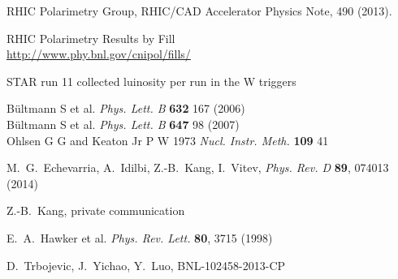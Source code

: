 \documentclass[12pt]{article}
\begin{document}
\begin{thebibliography}{9}
RHIC Polarimetry Group, RHIC/CAD Accelerator Physics Note, 490 (2013).

RHIC Polarimetry Results by Fill \\
\url{http://www.phy.bnl.gov/cnipol/fills/}

STAR run 11 collected luinosity per run in the W triggers\\

B\"{u}ltmann S et al. {\it Phys. Lett. B} {\bf 632} 167 (2006)\\
B\"{u}ltmann S et al. {\it Phys. Lett. B} {\bf 647} 98 (2007)\\
Ohlsen G G and Keaton Jr P W 1973 {\it Nucl. Instr. Meth.} {\bf 109} 41

M.~G.~Echevarria, A.~Idilbi, Z.-B.~Kang, I.~Vitev,
{\it Phys. Rev. D} {\bf 89}, 074013 (2014)

Z.-B.~Kang, private communication

E.~A.~Hawker et al. {\it Phys. Rev. Lett.} {\bf 80}, 3715 (1998)

D.~Trbojevic, J.~Yichao, Y.~Luo, BNL-102458-2013-CP
\end{thebibliography}
\end{document}
